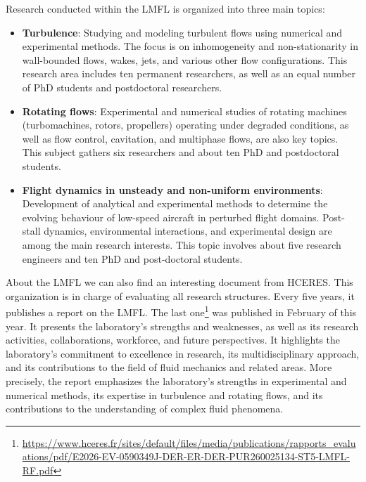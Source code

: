 \newpage

Research conducted within the LMFL is organized into three main topics:
\begin{itemize}
    \item \textbf{Turbulence}: Studying and modeling turbulent flows using numerical and experimental methods. The focus is on inhomogeneity and non-stationarity in wall-bounded flows, wakes, jets, and various other flow configurations. This research area includes ten permanent researchers, as well as an equal number of PhD students and postdoctoral researchers.
    \item \textbf{Rotating flows}: Experimental and numerical studies of rotating machines (turbomachines, rotors, propellers) operating under degraded conditions, as well as flow control, cavitation, and multiphase flows, are also key topics.
    This subject gathers six researchers and about ten PhD and postdoctoral students. %
    \item \textbf{Flight dynamics in unsteady and non-uniform environments}: Development of analytical and experimental methods to determine the evolving behaviour of low-speed aircraft in perturbed flight domains. Post-stall dynamics, environmental interactions, and experimental design are among the main research interests. This topic involves about five research engineers and ten PhD and post-doctoral students.
\end{itemize}

About the LMFL we can also find an interesting document from \ac{HCERES}. This organization is in charge of evaluating all research structures. Every five years, it publishes a report on the LMFL. The last one\footnote{\url{https://www.hceres.fr/sites/default/files/media/publications/rapports_evaluations/pdf/E2026-EV-0590349J-DER-ER-DER-PUR260025134-ST5-LMFL-RF.pdf}} was published in February of this year.
It presents the laboratory's strengths and weaknesses, as well as its research activities, collaborations, workforce, and future perspectives.
It highlights the laboratory's commitment to excellence in research, its multidisciplinary approach, and its contributions to the field of fluid mechanics and related areas. More precisely, the report emphasizes the laboratory's strengths in experimental and numerical methods, its expertise in turbulence and rotating flows, and its contributions to the understanding of complex fluid phenomena.

